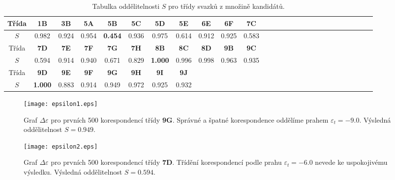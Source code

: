 \begin{table}[h!]
\centering
\begin{tabular}{|c|c|c|c|c|c|c|c|c|c|c|c|c|c|c|c|c|c|c|c|c|c|c|c|c|c|c|}
\hline
Třída & \textbf{1B} & \textbf{3B} & \textbf{5A}  & \textbf{5B} & \textbf{5C} & \textbf{5D} & \textbf{5E} & \textbf{6E} & \textbf{6F} & \textbf{7C} \\
\hline
$S$	  & 0.982		& 0.924 	  & 0.954 		 & \textbf{0.454} 	   & 0.936 	     & 0.975 	   & 
0.614 		& 0.912 	  & 0.925 	    & 0.583 \\
\hline 
\cline{1-11}
Třída & \textbf{7D} & \textbf{7E} & \textbf{7F}  & \textbf{7G} & \textbf{7H} & \textbf{8B} & \textbf{8C} & \textbf{8D} & \textbf{9B} & \textbf{9C} \\
\hline
$S$   & 0.594        & 0.914      & 0.940        & 0.671       & 0.829       & \textbf{1.000} & 
0.996        & 0.998      & 0.963       & 0.935 \\
\hline 
\cline{1-8}
Třída & \textbf{9D} & \textbf{9E} & \textbf{9F}  & \textbf{9G} & \textbf{9H} & \textbf{9I} & \textbf{9J} \\
\cline{1-8}
$S$& \textbf{1.000} & 0.883 & 0.914 & 0.949 & 0.972 & 0.925 & 0.932 \\
\cline{1-8}
\end{tabular}
\caption{Tabulka oddělitelnosti $S$ pro třídy svazků z množině kandidátů.}
\label{table: CritSeperability}
\end{table}




\begin{figure}[htps]
\centering
\texttt{[image: epsilon1.eps]}
\caption[Změna kritéria korespondencí třídy \textbf{9G}.] {Graf $\Delta\varepsilon$ pro prvních 500 korespondencí třídy \textbf{9G}. Správné a špatné korespondence oddělíme prahem $\varepsilon_t = -9.0$. Výsledná oddělitelnost $S = 0.949$.}
\label{fig: epsilon1}
\end{figure}

\begin{figure}[htps]
\centering
\texttt{[image: epsilon2.eps]}
\caption[Změna kritéria korespondencí třídy \textbf{7D}.]{Graf $\Delta\varepsilon$ pro prvních 500 korespondencí třídy \textbf{7D}. Třídění korespondencí podle prahu $\varepsilon_t = -6.0$ nevede ke uspokojivému výsledku. Výsledná oddělitelnost $S = 0.594$.}
\label{fig: epsilon2}
\end{figure}

\clearpage